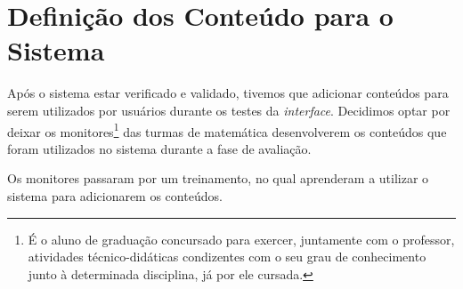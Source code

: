 \section{Definição dos Conteúdo para o Sistema}

Após o sistema estar verificado e validado, tivemos que adicionar conteúdos para serem utilizados por usu\'arios durante os testes da \textit{interface}. Decidimos optar por deixar os monitores\footnote{É o aluno de graduação concursado para exercer, juntamente com o professor, atividades técnico-didáticas condizentes com o seu grau de conhecimento junto à determinada disciplina, já por ele cursada.} das turmas de matemática desenvolverem os conteúdos que foram utilizados no sistema durante a fase de avaliação. 

Os monitores passaram por um treinamento, no qual aprenderam a utilizar o sistema para adicionarem os conteúdos.